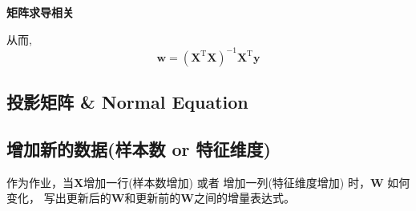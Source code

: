 \documentclass[UTF8]{ctexart}
\numberwithin{equation}{section}
\begin{document}
\textbf{矩阵求导相关}
\begin{center} 
\end{center}
从而,
\begin{equation*}
    \boldsymbol{w}=\left(\boldsymbol{X}^{\mathrm{T}} \boldsymbol{X}\right)^{-1} \boldsymbol{X}^{\mathrm{T}} \boldsymbol{y}
\end{equation*}

\subsection{投影矩阵 \& Normal Equation}

\subsection{增加新的数据(样本数 or 特征维度)}
作为作业，当$\boldsymbol{X}$增加一行(样本数增加) 或者 增加一列(特征维度增加) 时，$\boldsymbol{W}$ 如何变化，
写出更新后的$\boldsymbol{W}$和更新前的$\boldsymbol{W}$之间的增量表达式。
\end{document}

